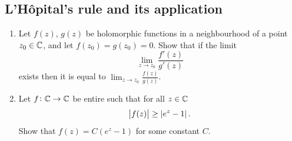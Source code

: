 \documentclass[11pt,a4paper]{article}
\begin{document}
\subsection{L'H\^opital's rule and its application}
\begin{exercise} \phantom{}
\begin{enumerate}
  \item[(1)] Let $f(z)$, $g(z)$ be holomorphic functions in a neighbourhood
    of a point $z_0 \in \mathbb{C}$, and let $f(z_0) = g(z_0) = 0$.
    Show that if the limit
    \[
      \lim_{z \to z_0} \frac{f'(z)}{g'(z)}
    \]
    exists then it is equal to
    $\lim_{z \to z_0} \frac{f(z)}{g(z)}$.
  \item[(2)] Let $f \colon \mathbb{C} \to \mathbb{C}$ be entire such that
    for all $z \in \mathbb{C}$
    \[
      \left\lvert f(z)\right\rvert \geq \left\lvert e^z - 1\right\rvert.
    \]
    Show that $f(z) = C (e^z - 1)$ for some constant $C$.
\end{enumerate}
\end{exercise}
\end{document}

